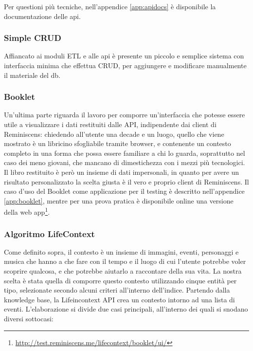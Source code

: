 \documentclass[sigproc-sp.tex]{subfiles}
\begin{document}
Per questioni più tecniche, nell'appendice \ref{app:apidocs} è disponibile la documentazione delle api.

\subsubsection{Simple CRUD}
Affiancato ai moduli ETL e alle api è presente un piccolo e semplice sistema con interfaccia minima che effettua CRUD, per aggiungere e modificare manualmente il materiale del db.

\subsubsection{Booklet}
\label{subsubsec:booklet}
Un’ultima parte riguarda il lavoro per comporre un’interfaccia che potesse essere utile a visualizzare i dati restituiti dalle API, indipendente dai client di Reminiscens: chiedendo all’utente una decade e un luogo, quello che viene mostrato è un libricino sfogliabile tramite browser, e contenente un contesto completo in una forma che possa essere familiare a chi lo guarda, soprattutto nel caso dei meno giovani, che mancano di dimestichezza con i mezzi più tecnologici. Il libro restituito è però un insieme di dati impersonali, in quanto per avere un risultato personalizzato la scelta giusta è il vero e proprio client di Reminiscens. Il caso d'uso del Booklet come applicazione per il testing è descritto nell'appendice \ref{app:booklet}, mentre per una prova pratica è disponibile online una versione della web app\footnote{\url{http://test.reminiscens.me/lifecontext/booklet/ui/}}.

\subsubsection{Algoritmo LifeContext}
\label{subsubsec:lifecontext}
Come definito sopra, il contesto è un insieme di immagini, eventi, personaggi e musica che hanno a che fare con il tempo e il luogo di cui l’utente potrebbe voler scoprire qualcosa, e che potrebbe aiutarlo a raccontare della sua vita. La nostra scelta è stata quella di comporre questo contesto utilizzando cinque entità per tipo, selezionate secondo alcuni criteri all’interno dell’indice.
Partendo dalla knowledge base, la Lifeincontext API crea un contesto intorno ad una lista di eventi. L’elaborazione si divide due casi principali, all’interno dei quali si snodano diversi sottocasi:
\end{document}
